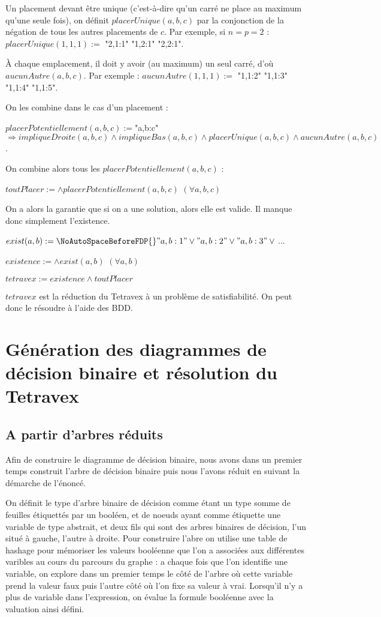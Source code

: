 \documentclass[11pt]{article}
\begin{document}
Un placement devant être unique (c'est-à-dire qu'un carré ne place au maximum qu'une seule fois), on définit $placerUnique(a, b, c)$ par la conjonction de la négation de tous les autres placements de $c$.
Par exemple, si $n = p = 2$ : $placerUnique(1, 1, 1) :=$ {\NoAutoSpaceBeforeFDP{} \neg "2,1:1" \land{} \neg "1,2:1" \land{} \neg "2,2:1"}.

À chaque emplacement, il doit y avoir (au maximum) un seul carré, d'où $aucunAutre(a, b, c)$.
Par exemple : $aucunAutre(1, 1, 1) :=$ {\NoAutoSpaceBeforeFDP{} \neg "1,1:2" \land{} \neg "1,1:3" \land{} \neg "1,1:4" \land{} \neg "1,1:5"}.

On les combine dans le cas d'un placement :

$placerPotentiellement(a, b, c) := ${\NoAutoSpaceBeforeFDP{}"a,b:c"}$ \Rightarrow{} impliqueDroite(a, b, c) \land{} impliqueBas(a, b, c) \land{} placerUnique(a, b, c) \land{} aucunAutre(a, b, c)$.

On combine alors tous les $placerPotentiellement(a, b, c)$ :

$toutPlacer := \land{} placerPotentiellement(a, b, c)$ $(\forall{} a, b, c)$

On a alors la garantie que si on a une solution, alors elle est valide.
Il manque donc simplement l'existence.

$exist(a, b) := {\NoAutoSpaceBeforeFDP{}"a,b:1" \lor{} "a,b:2" \lor{} "a,b:3" \lor{}}$...

$existence := \land{} exist(a, b)$ $(\forall{} a, b)$

$tetravex := existence \land{} toutPlacer$

$tetravex$ est la réduction du Tetravex à un problème de satisfiabilité. On peut donc le résoudre à l'aide des BDD.

\section{Génération des diagrammes de décision binaire et résolution du Tetravex}
\subsection{A partir d'arbres réduits}
Afin de construire le diagramme de décision binaire, nous avons dans un premier temps construit l'arbre de décision binaire puis nous l'avons réduit en suivant la démarche de l'énoncé.

On définit le type d'arbre binaire de décision comme étant un type somme de feuilles étiquettés par un booléen, et de noeuds ayant comme étiquette une variable de type abstrait, et deux fils qui sont des arbres binaires de décision, l'un situé à gauche, l'autre à droite. Pour construire l'abre on utilise une table de hashage pour mémoriser les valeurs booléenne que l'on a associées aux différentes varibles au cours du parcours du graphe : a chaque fois que l'on identifie une variable, on explore dans un premier temps le côté de l'arbre où cette variable prend la valeur faux puis l'autre côté où l'on fixe sa valeur à vrai. Lorsqu'il n'y a plus de variable dans l'expression, on évalue la formule booléenne avec la valuation ainsi défini.
\end{document}
